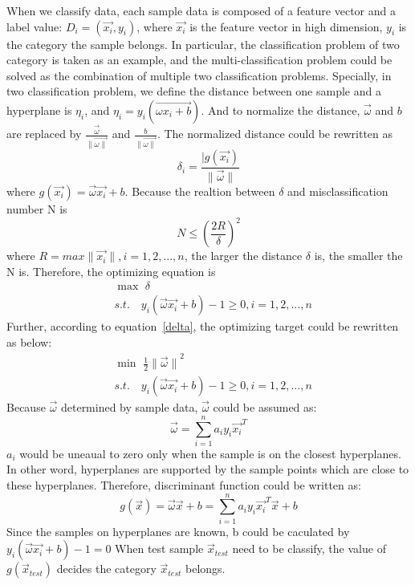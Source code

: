 \documentclass[runningheads,a4paper]{llncs}
\begin{document}
When we classify data, each sample data is composed of a feature vector and a
label value: $D_i = (\vec{x_i}, y_i)$, where $\vec{x_i}$ is the feature vector
in high dimension, $y_i$ is the category the sample belongs. In particular, the
classification problem of two category is taken as an example, and the multi-classification
problem could be solved as the combination of multiple two classification problems.
Specially, in two classification problem, we define the distance between one sample
and a hyperplane is $\eta_i$, and $\eta_i = y_i(\vec{\omega x_i + b})$. And to normalize the distance,
$\vec{\omega}$ and $b$ are replaced by $\frac{\vec{\omega}}{\|\vec{\omega\|}}$
and $\frac{b}{\|\vec{\omega\|}}$. The normalized distance could be rewritten
as
\begin{equation}
  \label{delta}
  \delta_i = \frac{|g(\vec{x_i})}{\|\vec{\omega}\|}
\end{equation}
where $g(\vec{x_i})=\vec{\omega}\vec{x_i}+b$.
Because the realtion between $\delta$ and misclassification number N is
\begin{equation}
  N \leq {(\frac{2R}{\delta})}^2
\end{equation}
where $R=max\|\vec{x_i}\|, i=1,2,...,n$, the larger the distance $\delta$ is, the
smaller the N is. Therefore, the optimizing equation is
\begin{equation}
  \begin{split}
  &\max \,\, \delta\\
  &s.t.\quad y_i(\vec{\omega}\vec{x_i}+b)-1 \geq 0,i=1,2,...,n
 \end{split}
\end{equation}
Further, according to equation~\ref{delta}, the optimizing target could be
rewritten as below:
\begin{equation}
  \begin{split}
  &\min \,\, \frac{1}{2}{\|\vec{\omega}\|}^2\\
  &s.t.\quad y_i(\vec{\omega}\vec{x_i}+b)-1 \geq 0,i=1,2,...,n
 \end{split}
\end{equation}
Because $\vec{\omega}$ determined by sample data, $\vec{\omega}$ could be assumed as:
\begin{equation}
  \vec{\omega} = \sum_{i=1}^{n}a_iy_i\vec{x_i}^T
\end{equation}
$a_i$ would be uneaual to zero only when the sample is on the closest hyperplanes.
In other word, hyperplanes are supported by the sample points which are close to
these hyperplanes. Therefore, discriminant function could be written as:
\begin{equation}
  g(\vec{x}) = \vec{\omega}\vec{x}+b=\sum_{i=1}^{n}a_iy_i\vec{x_i}^T\vec{x}+b
\end{equation}
Since the samples on hyperplanes are known, b could be caculated by $y_i(\vec{\omega}\vec{x_i}+b)-1=0$
When test sample $\vec{x}_{test}$ need to be classify, the value of $g(\vec{x}_{test})$
decides the category $\vec{x}_{test}$ belongs.
\end{document}
